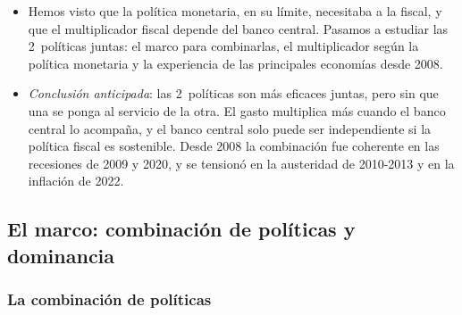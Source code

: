 \documentclass[11pt]{article}
\begin{document}
\begin{itemize}
\item Hemos visto que la política monetaria, en su límite, necesitaba a la fiscal, y que el multiplicador fiscal depende del banco central. Pasamos a estudiar las 2~políticas juntas: el marco para combinarlas, el multiplicador según la política monetaria y la experiencia de las principales economías desde 2008.
\item \emph{Conclusión anticipada}: las 2~políticas son más eficaces juntas, pero sin que una se ponga al servicio de la otra. El gasto multiplica más cuando el banco central lo acompaña, y el banco central solo puede ser independiente si la política fiscal es sostenible. Desde 2008 la combinación fue coherente en las recesiones de 2009 y 2020, y se tensionó en la austeridad de 2010-2013 y en la inflación de 2022.
\end{itemize}

\subsection{El marco: combinación de políticas y dominancia}\label{sec:policy-mix}

\subsubsection{La combinación de políticas}\label{sec:cuadrantes}
\end{document}
